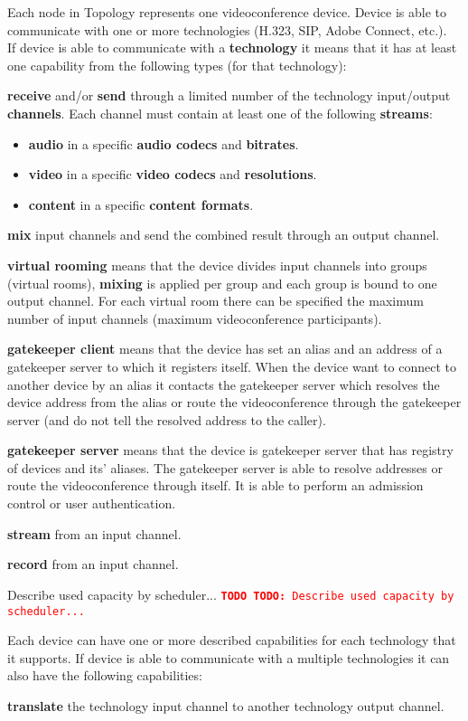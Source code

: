 \documentclass[a4paper]{report}
\newcommand{\TODO}[1]{%
\def\empty{}%
\def\prvniparametr{#1}%
\ifx\prvniparametr\empty%
\begingroup\tt\textcolor{red}{\noindent\textbf{TODO}}\endgroup
\else%
\begingroup\tt\textcolor{red}{\noindent\textbf{TODO:}\ #1}\endgroup
\fi%
}
\begin{document}
Each node in Topology represents one videoconference device. Device is able to communicate with one or more technologies (H.323, SIP, Adobe Connect, etc.).
\\
If device is able to communicate with a \textbf{technology} it means that it 
has at least one capability from the following types (for that technology):
\begin{compactitem}
\item \textbf{receive} and/or \textbf{send} through a limited number of 
  the technology input/output \textbf{channels}. Each channel must contain 
  at least one of the following \textbf{streams}:
  \begin{itemize}
    \item \textbf{audio} in a specific \textbf{audio codecs} and 
      \textbf{bitrates}.
    \item \textbf{video} in a specific \textbf{video codecs} and 
      \textbf{resolutions}.
    \item \textbf{content} in a specific \textbf{content formats}.
  \end{itemize} 
\item \textbf{mix} input channels and send the combined result through 
  an output channel.
\item \textbf{virtual rooming} means that the device divides input channels 
  into groups (virtual rooms), \textbf{mixing} is applied per group and
  each group is bound to one output channel. For each virtual room there can 
  be specified the maximum number of input channels (maximum videoconference 
  participants).
\item \textbf{gatekeeper client} means that the device has set an alias 
  and an address of a gatekeeper server to which it registers itself.
  When the device want to connect to another device by an alias it contacts 
  the gatekeeper server which resolves the device address from the alias 
  or route the videoconference through the gatekeeper server (and do not tell
  the resolved address to the caller).
\item \textbf{gatekeeper server} means that the device is gatekeeper server
  that has registry of devices and its' aliases. The gatekeeper server is
  able to resolve addresses or route the videoconference through itself. It is 
  able to perform an admission control or user authentication.
\item \textbf{stream} from an input channel.
\item \textbf{record} from an input channel.
\item \TODO{Describe used capacity by scheduler...}
\end{compactitem}
Each device can have one or more described capabilities for each technology
that it supports.
If device is able to communicate with a multiple technologies it can also have the following capabilities:
\begin{compactitem}
\item \textbf{translate} the technology input channel to another technology output 
  channel.
\end{compactitem}
\end{document}

